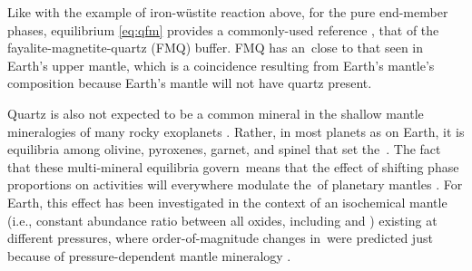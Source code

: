 Like with the example of iron-w\"ustite reaction above, for the pure end-member phases, equilibrium \eqref{eq:qfm} provides a commonly-used reference \fo, that of the fayalite-magnetite-quartz (FMQ) buffer. FMQ has an \fo\,close to that seen in Earth's upper mantle, which is a coincidence resulting from Earth's mantle's composition because Earth's mantle will not have quartz present.


Quartz is also not expected to be a common mineral in the shallow mantle mineralogies of many rocky exoplanets \citep{spaargaren_plausible_2022, guimond_mantle_2023}. Rather, in most planets as on Earth, it is equilibria among olivine, pyroxenes, garnet, and spinel that set the \fo\,\citep[see][for a detailed review of these effects]{stolper_effects_2020}. The fact that these multi-mineral equilibria govern \fo\,means that the effect of shifting phase proportions on  activities will everywhere modulate the \fo\,of planetary mantles \citep[e.g.,][]{frost_introduction_1991, oneill_ferric_1993, ballhaus_upper_1995, rohrbach_metal_2007, frost_redox_2008, jennings_simple_2015, stolper_effects_2020}. For Earth, this effect has been investigated in the context of an isochemical mantle (i.e., constant abundance ratio between all oxides, including  and ) existing at different pressures, where order-of-magnitude changes in \fo\,were predicted just because of pressure-dependent mantle mineralogy \citep{stolper_effects_2020}. 

